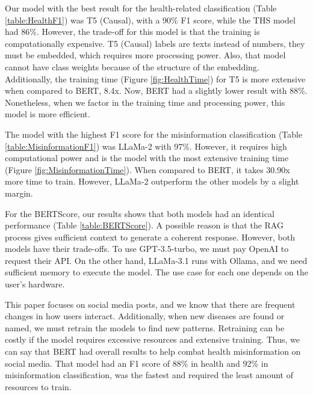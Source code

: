 Our model with the best result for the health-related classification (Table \ref{table:HealthF1}) was T5 (Causal), with a 90\% F1 score, while the THS model had 86\%. However, the trade-off
for this model is that the training is computationally expensive. T5 (Causal) labels are texts instead of numbers, they must be embedded, which requires more processing power. Also,
that model cannot have class weights because of the structure of the embedding. Additionally, the training time (Figure \ref{fig:HealthTime}) for T5 is more extensive
when compared to BERT, 8.4x. Now, BERT had a slightly lower result with 88\%. Nonetheless, when we factor in the training time and processing power, this model is more efficient.

The model with the highest F1 score for the misinformation classification (Table \ref{table:MisinformationF1}) was LLaMa-2 with 97\%. However, it requires high computational power and is
the model with the most extensive training time (Figure \ref{fig:MisinformationTime}). When compared to BERT, it takes 30.90x more time to train. However, LLaMa-2 outperform the
other models by a slight margin. 

For the BERTScore, our results shows that both models had an identical performance (Table \ref{table:BERTScore}). A possible reason is that the RAG process gives sufficient context to generate a
coherent response. However, both models have their trade-offs. To use GPT-3.5-turbo, we must pay OpenAI to request their API. On the other hand, LLaMa-3.1 runs with Ollama, and we need
sufficient memory to execute the model. The use case for each one depends on the user's hardware.

This paper focuses on social media posts, and we know that there are frequent changes in how users interact. Additionally, when new diseases are found or named, we must retrain the
models to find new patterns. Retraining can be costly if the model requires excessive resources and extensive training. Thus, we can say that BERT had overall results to help combat
health misinformation on social media. That model had an F1 score of 88\% in health and 92\% in misinformation classification, was the fastest and required the least amount of resources to train.




